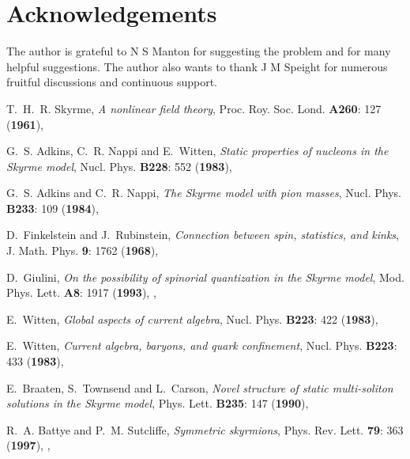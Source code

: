 \documentclass[a4paper,12pt]{article}
\begin{document}
\section*{Acknowledgements}

The author is grateful to N S Manton for suggesting the problem and for 
many helpful suggestions. The author also wants to thank J M Speight for 
numerous fruitful discussions and continuous support.

\renewcommand{\baselinestretch}{1}
\begin{small}

\begin{thebibliography}{10}

T.~H.~R. Skyrme, {\em A nonlinear field theory\/}, Proc. Roy. Soc. Lond. {\bf
  A260}: 127 ({\bf 1961}),

G.~S. Adkins, C.~R. Nappi and E.~Witten, {\em Static properties of nucleons in
  the {S}kyrme model\/}, Nucl. Phys. {\bf B228}: 552 ({\bf 1983}),

G.~S. Adkins and C.~R. Nappi, {\em The {S}kyrme model with pion masses\/},
  Nucl. Phys. {\bf B233}: 109 ({\bf 1984}),

D.~Finkelstein and J.~Rubinstein, {\em Connection between spin, statistics, and
  kinks\/}, J. Math. Phys. {\bf 9}: 1762 ({\bf 1968}),

D.~Giulini, {\em On the possibility of spinorial quantization in the {S}kyrme
  model\/}, Mod. Phys. Lett. {\bf A8}: 1917 ({\bf 1993}),
  {},

E.~Witten, {\em Global aspects of current algebra\/}, Nucl. Phys. {\bf B223}:
  422 ({\bf 1983}),

E.~Witten, {\em Current algebra, baryons, and quark confinement\/}, Nucl. Phys.
  {\bf B223}: 433 ({\bf 1983}),

E.~Braaten, S.~Townsend and L.~Carson, {\em Novel structure of static
  multi-soliton solutions in the {S}kyrme model\/}, Phys. Lett. {\bf B235}: 147
  ({\bf 1990}),

R.~A. Battye and P.~M. Sutcliffe, {\em Symmetric skyrmions\/}, Phys. Rev. Lett.
  {\bf 79}: 363 ({\bf 1997}), {},


\end{thebibliography}
\end{small}
\end{document}
